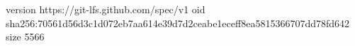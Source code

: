 version https://git-lfs.github.com/spec/v1
oid sha256:70561d56d3c1d072eb7aa614e39d7d2ceabe1eceff8ea5815366707dd78fd642
size 5566
